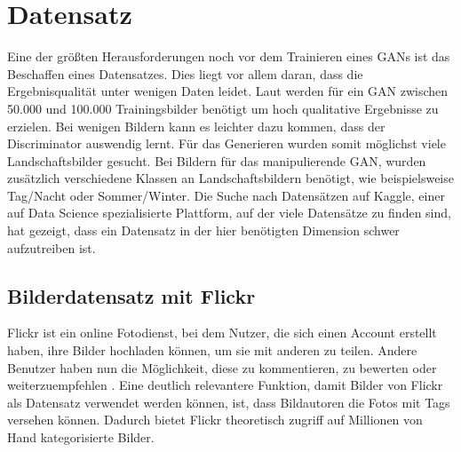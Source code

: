 \chapter{Datensatz}\label{chp:datensatz} %
\glsresetall
Eine der größten Herausforderungen noch vor dem Trainieren eines GANs ist das Beschaffen eines Datensatzes.  Dies liegt vor allem daran, dass die Ergebnisqualität unter wenigen Daten leidet. Laut   \cite{noauthor_nvidia_2020} werden für ein GAN zwischen 50.000 und 100.000 Trainingsbilder benötigt um hoch qualitative Ergebnisse zu erzielen. Bei wenigen Bildern kann es leichter dazu kommen, dass der Discriminator auswendig lernt. Für das Generieren wurden somit möglichst viele Landschaftsbilder gesucht. Bei Bildern für das manipulierende GAN, wurden zusätzlich verschiedene Klassen an Landschaftsbildern  benötigt, wie beispielsweise Tag/Nacht oder Sommer/Winter. Die Suche nach Datensätzen auf Kaggle, einer auf Data Science spezialisierte Plattform, auf der viele Datensätze zu finden sind, hat gezeigt, dass ein Datensatz in der hier benötigten Dimension schwer aufzutreiben ist.

\section{Bilderdatensatz mit Flickr} %
Flickr ist ein online Fotodienst, bei dem Nutzer, die sich einen Account erstellt haben, ihre Bilder hochladen können, um sie mit anderen zu teilen. Andere Benutzer haben nun die Möglichkeit, diese zu kommentieren, zu bewerten oder weiterzuempfehlen \cite{noauthor_was_nodate}. Eine deutlich relevantere Funktion, damit Bilder von Flickr als Datensatz verwendet werden können, ist, dass Bildautoren die Fotos mit Tags versehen können. Dadurch bietet Flickr theoretisch zugriff auf Millionen von Hand kategorisierte Bilder. 

